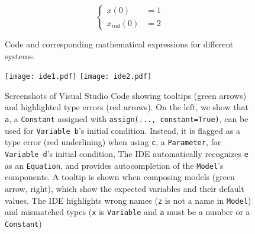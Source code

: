 \begin{figure*}[t]
\begin{minipage}[t]{\columnwidth}
{\begin{minipage}[c]{0.2\columnwidth}
{    \[
    \begin{cases}
        x(0) &= 1 \\
        x_{ind}(0) &= 2
    \end{cases}
    \]
    
    }
    
    \end{minipage}%
    
    
    }
    
    \end{minipage}%
    
    \caption{\label{fig-poincare}Code and corresponding mathematical
    expressions for different systems.}
    
    \end{figure*}
    
  
\begin{figure}[t]
  \texttt{[image: ide1.pdf]}
  \texttt{[image: ide2.pdf]}
  \caption{
    \label{fig-ide}
    Screenshots of Visual Studio Code showing
    tooltips (green arrows) and
    highlighted type errors (red arrows).
    On the left,
    we show that \texttt{a},
    a \texttt{Constant} assigned with \texttt{assign(...,\ constant=True)},
    can be used for \texttt{Variable b}'s initial condition.
    Instead,
    it is flagged as a type error (red underlining)
    when using \texttt{c}, a \texttt{Parameter},
    for \texttt{Variable d}'s initial condition,
    The IDE automatically recognizes \texttt{e} as an \texttt{Equation},
    and provides autocompletion of the \texttt{Model}'s components.
    A tooltip is shown when composing models (green arrow, right),
    which show the expected variables and their default values.
    The IDE highlights wrong names (\texttt{z} is not a name in \texttt{Model})
    and mismatched types (\texttt{x} is \texttt{Variable} and \texttt{a} must be a number or a \texttt{Constant})
  }  
\end{figure}
  
